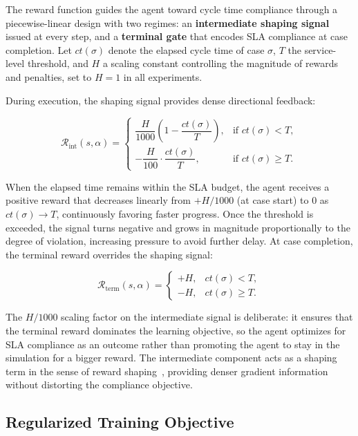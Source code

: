 \documentclass[journal,onecolumn]{IEEEtran}
\begin{document}
The reward function guides the agent toward cycle time compliance through a
piecewise-linear design with two regimes: an \textbf{intermediate shaping
signal} issued at every step, and a \textbf{terminal gate} that encodes SLA
compliance at case completion. Let $ct(\sigma)$ denote the elapsed cycle time of case $\sigma$,
$T$ the service-level threshold, and $H$ a scaling constant controlling the magnitude of rewards
and penalties, set to $H=1$ in all experiments.

During execution, the shaping signal provides dense directional feedback:

\[
\mathcal{R}_{\text{int}}(s,\alpha)=
\begin{cases}
\dfrac{H}{1000}\!\left(1-\dfrac{ct(\sigma)}{T}\right), &
  \text{if } ct(\sigma)<T,\\[10pt]
-\dfrac{H}{100}\cdot\dfrac{ct(\sigma)}{T}, &
  \text{if } ct(\sigma)\ge T.
\end{cases}
\]

When the elapsed time remains within the SLA budget, the agent receives a
positive reward that decreases linearly from $+H/1000$ (at case start) to $0$
as $ct(\sigma)\to T$, continuously favoring faster progress. Once the threshold
is exceeded, the signal turns negative and grows in magnitude proportionally to
the degree of violation, increasing pressure to avoid further delay. At case
completion, the terminal reward overrides the shaping signal:

\[
\mathcal{R}_{\text{term}}(s,\alpha)=
\begin{cases}
+H, & ct(\sigma)<T,\\
-H, & ct(\sigma)\ge T.
\end{cases}
\]

The $H/1000$ scaling factor on the intermediate signal is deliberate: it ensures
that the terminal reward dominates the learning objective, so the agent
optimizes for SLA compliance as an outcome rather than promoting the agent
to stay in the simulation for a bigger reward.
The intermediate component acts as a shaping term in the sense of
reward shaping~\cite{sutton_2018_rl_intro}, providing denser gradient
information without distorting the compliance objective.

\subsection{Regularized Training Objective}
\label{subsec:regularization_method}
\end{document}
